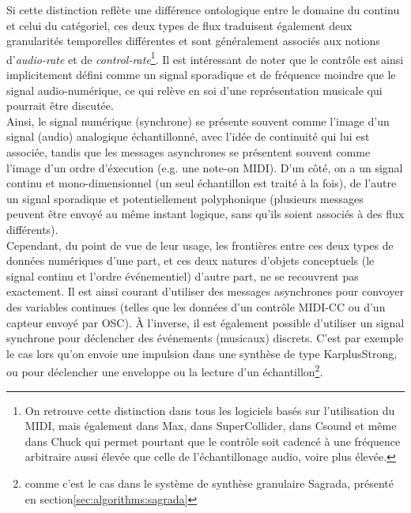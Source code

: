 \noindent Si cette distinction reflète une différence ontologique entre le domaine du continu et celui du catégoriel, ces deux types de flux traduisent également deux granularités temporelles différentes et sont généralement associés aux notions d'\textit{audio-rate} et de \textit{control-rate}\footnote{On retrouve cette distinction dans tous les logiciels basés sur l'utilisation du \gls{MIDI}, mais également dans Max, dans SuperCollider, dans Csound et même dans Chuck qui permet pourtant que le contrôle soit cadencé à une fréquence arbitraire aussi élevée que celle de l'échantillonage audio, voire plus élevée.}. Il est intéressant de noter que le contrôle est ainsi implicitement défini comme un signal sporadique et de fréquence moindre que le signal audio-numérique, ce qui relève en soi d'une représentation musicale qui pourrait être discutée.\\
\indent Ainsi, le signal numérique (synchrone) se présente souvent comme l'image d'un signal (audio) analogique échantillonné, avec l'idée de continuité qui lui est associée, tandis que les messages asynchrones se présentent souvent comme l'image d'un ordre d'éxecution (e.g. une note-on \gls{MIDI}). D'un côté, on a un signal continu et mono-dimensionnel (un seul échantillon est traité à la fois), de l'autre un signal sporadique et potentiellement polyphonique (plusieurs messages peuvent être envoyé au même instant logique, sans qu'ils soient associés à des flux différents).\\
\indent Cependant, du point de vue de leur usage, les frontières entre ces deux types de données numériques d'une part, et ces deux natures d'objets conceptuels (le signal continu et l'ordre événementiel) d'autre part, ne se recouvrent pas exactement. Il est ainsi courant d'utiliser des messages asynchrones pour convoyer des variables continues (telles que les données d'un contrôle MIDI-CC ou d'un capteur envoyé par \gls{OSC}). À l'inverse, il est également possible d'utiliser un signal synchrone pour déclencher des événements (musicaux) discrets. C'est par exemple le cas lors qu'on envoie une impulsion dans une synthèse de type \gls{KarplusStrong}, ou pour déclencher une enveloppe ou la lecture d'un échantillon\footnote{comme c'est le cas dans le système de synthèse granulaire Sagrada, présenté en section\ref{sec:algorithms:sagrada}}.

